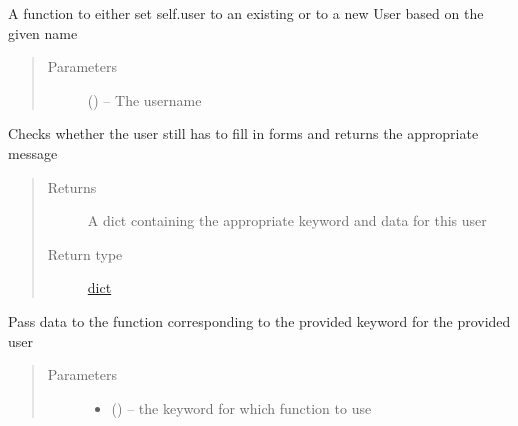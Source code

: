 \documentclass[letterpaper,10pt,english]{sphinxmanual}
\begin{document}
\begin{fulllineitems}

\begin{fulllineitems}
\label{\detokenize{consumer:consumer.Consumer.authenticate}}
A function to either set self.user to an existing {\hyperref[\detokenize{user:user.User}]{}} or to a new User based on the given name
\begin{quote}\begin{description}
\item[{Parameters}] \leavevmode
{} (\href{https://docs.python.org/2/library/functions.html\#str}{}) -- The username

\end{description}\end{quote}

\end{fulllineitems}


\begin{fulllineitems}
\label{\detokenize{consumer:consumer.Consumer.check_prerequisites}}
Checks whether the user still has to fill in forms and returns the appropriate message
\begin{quote}\begin{description}
\item[{Returns}] \leavevmode
A dict containing the appropriate keyword and data for this user

\item[{Return type}] \leavevmode
\href{https://docs.python.org/2/library/stdtypes.html\#dict}{dict}

\end{description}\end{quote}

\end{fulllineitems}


\begin{fulllineitems}
\label{\detokenize{consumer:consumer.Consumer.consumer}}
Pass data to the function corresponding to the provided keyword for the provided user
\begin{quote}\begin{description}
\item[{Parameters}] \leavevmode\begin{itemize}
\item {} 
 (\href{https://docs.python.org/2/library/functions.html\#str}{}) -- the keyword for which function to use


\end{itemize}
\end{description}
\end{quote}
\end{fulllineitems}
\end{fulllineitems}
\end{document}
